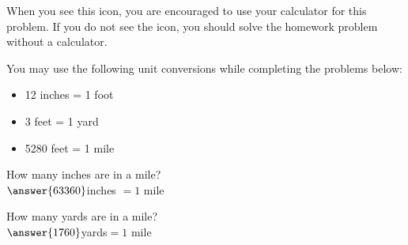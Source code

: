 \documentclass{ximera}
\author{David Kish}
\begin{document}
\calcHW When you see this icon, you are encouraged to use your calculator for this problem.  If you do not see the icon, you should solve the homework problem without a calculator.

You may use the following unit conversions while completing the problems below:
\begin{itemize}
\item 12 inches = 1 foot
\item 3 feet = 1 yard
\item 5280 feet = 1 mile
\end{itemize}

\begin{exercise} 
How many inches are in a mile? \\
$\answer{63360}$\calcHW inches $= 1$ mile 
\end{exercise}
 \begin{exercise}
 How many yards are in a mile? \\
 $\answer{1760}$\calcHW yards$ = 1$ mile
 \end{exercise}
\end{document}
